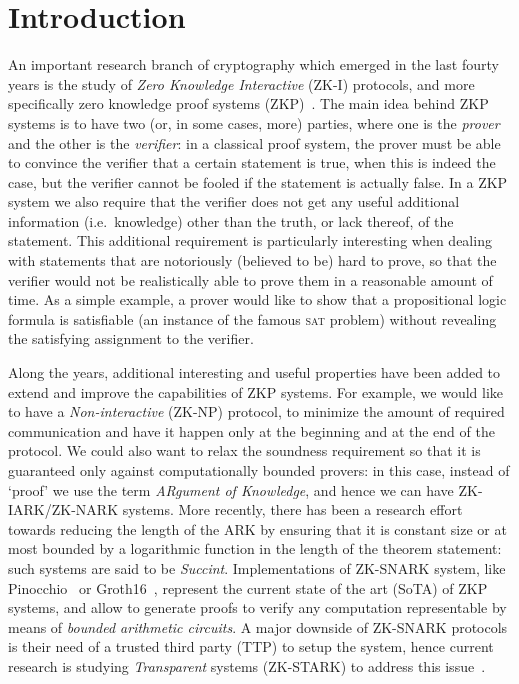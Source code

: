 \chapter{Introduction}
An important research branch of cryptography which emerged in the last fourty years is the study of
\emph{Zero Knowledge Interactive} (ZK-I) protocols, and more specifically zero knowledge proof 
systems (ZKP)~\cite{GoldwasserMR1989}.
The main idea behind ZKP systems is to have two (or, in some cases, more) parties, where 
one is the \emph{prover} and the other is the \emph{verifier}: in a classical proof system, the prover
must be able to convince the verifier that a certain statement is true, when this is indeed the case, 
but the verifier cannot be fooled if the statement is actually false.
In a ZKP system we also require that the verifier does not get any useful additional information 
(i.e.\ knowledge) other than the truth, or lack thereof, of the statement.
This additional requirement is particularly interesting when dealing with statements that are 
notoriously (believed to be) hard to prove, so that the verifier would not be realistically able to 
prove them in a reasonable amount of time.
As a simple example, a prover would like to show that a propositional logic formula is satisfiable 
(an instance of the famous \textsc{sat} problem) without revealing the satisfying assignment to the
verifier.  

Along the years, additional interesting and useful properties have been added to extend and improve 
the capabilities of ZKP systems.
For example, we would like to have a \emph{Non-interactive} (ZK-NP) protocol, to minimize the amount 
of required communication and have it happen only at the beginning and at the end of the protocol.
We could also want to relax the soundness requirement so that it is guaranteed only against 
computationally bounded provers: in this case, instead of `proof' we use the term 
\emph{ARgument of Knowledge}, and hence we can have ZK-IARK/ZK-NARK systems.
More recently, there has been a research effort towards reducing the length of the ARK by ensuring 
that it is constant size or at most bounded by a logarithmic function in the length of the theorem 
statement: such systems are said to be \emph{Succint}. 
Implementations of ZK-SNARK system, like Pinocchio~\cite{ParnoGHR2013} or Groth16~\cite{Groth2016}, 
represent the current state of the art (SoTA) of ZKP systems, and allow to generate proofs to verify any 
computation representable by means of \emph{bounded arithmetic circuits}.
A major downside of ZK-SNARK protocols is their need of a trusted third party (TTP) to setup the 
system, hence current research is studying \emph{Transparent} systems (ZK-STARK) to address this 
issue~\cite{SassonBHR2018}.

